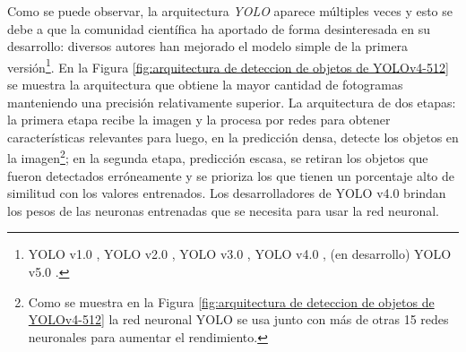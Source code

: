 \begin{savenotes}
\end{savenotes}

Como se puede observar, la arquitectura \textit{YOLO} aparece múltiples veces y esto se debe a que la comunidad científica ha aportado de forma desinteresada en su desarrollo: diversos autores han mejorado el modelo simple de la primera versión\footnote{YOLO v1.0 \cite{Redmon2016}, YOLO v2.0 \cite{Redmon2017}, YOLO v3.0 \cite{Redmon2018}, YOLO v4.0 \cite{Solawetz2020}, (en desarrollo) YOLO v5.0 \cite{bochkovskiy2020yolov4}.}. En la Figura \ref{fig:arquitectura de deteccion de objetos de YOLOv4-512} se muestra la arquitectura que obtiene la mayor cantidad de fotogramas manteniendo una precisión relativamente superior. La arquitectura de dos etapas: la primera etapa recibe la imagen y la procesa por redes para obtener características relevantes para luego, en la predicción densa, detecte los objetos en la imagen\footnote{Como se muestra en la Figura \ref{fig:arquitectura de deteccion de objetos de YOLOv4-512} la red neuronal YOLO se usa junto con más de otras 15 redes neuronales para aumentar el rendimiento.}; en la segunda etapa, predicción escasa, se retiran los objetos que fueron detectados erróneamente y se prioriza los que tienen un porcentaje alto de similitud con los valores entrenados. Los desarrolladores de YOLO v4.0 brindan los pesos de las neuronas entrenadas que se necesita para usar la red neuronal.

